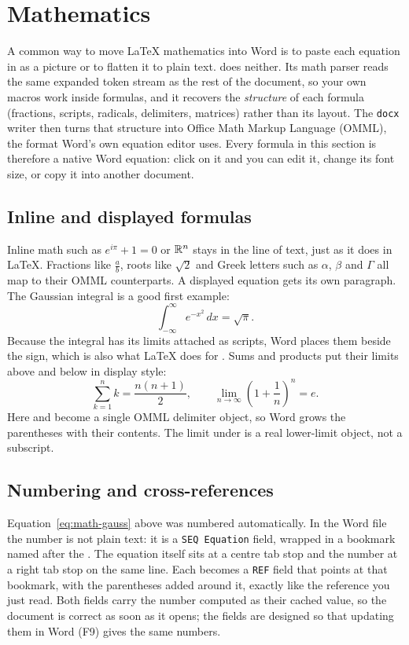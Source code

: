 \section{Mathematics}\label{sec:math}

A common way to move \LaTeX{} mathematics into Word is to paste each equation in as a
picture or to flatten it to plain text. \texdocx{} does neither. Its math parser reads
the same expanded token stream as the rest of the document, so your own macros work inside
formulas, and it recovers the \emph{structure} of each formula (fractions, scripts, radicals,
delimiters, matrices) rather than its layout. The \texttt{docx} writer then turns that
structure into Office Math Markup Language (OMML), the format Word's own equation editor
uses. Every formula in this section is therefore a native Word equation: click on it and
you can edit it, change its font size, or copy it into another document.

\subsection{Inline and displayed formulas}

Inline math such as $e^{i\pi} + 1 = 0$ or $\mathbb{R}^n$ stays in the line of text, just as it does in
\LaTeX. Fractions like $\frac{a}{b}$, roots like $\sqrt{2}$ and Greek letters such as
$\alpha$, $\beta$ and $\Gamma$ all map to their OMML counterparts. A displayed equation
gets its own paragraph. The Gaussian integral is a good first example:
\begin{equation}\label{eq:math-gauss}
  \int_{-\infty}^{\infty} e^{-x^2} \, dx = \sqrt{\pi}.
\end{equation}
Because the integral has its limits attached as scripts, Word places them beside the sign,
which is also what \LaTeX{} does for . Sums and products put their limits above
and below in display style:
\[
  \sum_{k=1}^{n} k = \frac{n(n+1)}{2},
  \qquad
  \lim_{n \to \infty} \left(1 + \frac{1}{n}\right)^{n} = e.
\]
Here  and  become a single OMML delimiter object, so Word grows the
parentheses with their contents. The limit under  is a real lower-limit object, not a
subscript.

\subsection{Numbering and cross-references}

Equation~\eqref{eq:math-gauss} above was numbered automatically. In the Word file the number
is not plain text: it is a \texttt{SEQ Equation} field, wrapped in a bookmark named after the
. The equation itself sits at a centre tab stop and the number at a right tab stop
on the same line. Each  becomes a \texttt{REF} field that points at that bookmark,
with the parentheses added around it, exactly like the reference you just read. Both fields
carry the number \texdocx{} computed as their cached value, so the document is correct as soon
as it opens; the fields are designed so that updating them in Word (F9) gives the same numbers.

